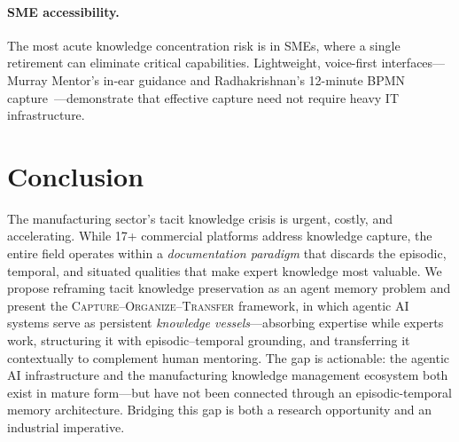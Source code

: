 \documentclass[]{ceurart}
\begin{document}
\paragraph{SME accessibility.}
The most acute knowledge concentration risk is in SMEs, where a single
retirement can eliminate critical capabilities. Lightweight, voice-first
interfaces---Murray Mentor's in-ear guidance and Radhakrishnan's
12-minute BPMN capture~\cite{radhakrishnan2025}---demonstrate that
effective capture need not require heavy IT infrastructure.

\section{Conclusion}\label{sec:conclusion}

The manufacturing sector's tacit knowledge crisis is urgent, costly,
and accelerating. While 17+ commercial platforms address knowledge
capture, the entire field operates within a \emph{documentation
paradigm} that discards the episodic, temporal, and situated qualities
that make expert knowledge most valuable. We propose reframing tacit
knowledge preservation as an agent memory problem and present the
\textsc{Capture--Organize--Transfer} framework, in which agentic AI
systems serve as persistent \emph{knowledge vessels}---absorbing
expertise while experts work, structuring it with episodic--temporal
grounding, and transferring it contextually to complement human
mentoring. The gap is actionable: the agentic AI infrastructure and the
manufacturing knowledge management ecosystem both exist in mature
form---but have not been connected through an episodic-temporal memory
architecture. Bridging this gap is both a research opportunity and an
industrial imperative.

\end{document}
